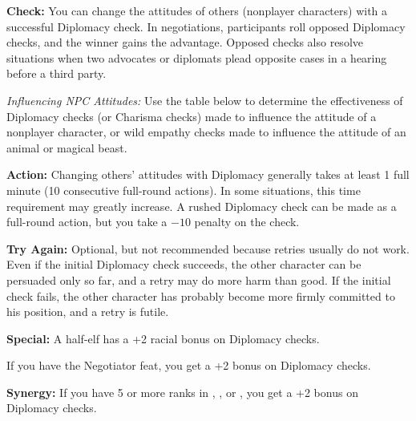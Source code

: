 \textbf{Check:} You can change the attitudes of others (nonplayer characters) with a successful Diplomacy check. In negotiations, participants roll opposed Diplomacy checks, and the winner gains the advantage. Opposed checks also resolve situations when two advocates or diplomats plead opposite cases in a hearing before a third party.

\textit{Influencing NPC Attitudes:} Use the table below to determine the effectiveness of Diplomacy checks (or Charisma checks) made to influence the attitude of a nonplayer character, or wild empathy checks made to influence the attitude of an animal or magical beast.



\textbf{Action:} Changing others' attitudes with Diplomacy generally takes at least 1 full minute (10 consecutive full-round actions). In some situations, this time requirement may greatly increase. A rushed Diplomacy check can be made as a full-round action, but you take a $-10$ penalty on the check.

\textbf{Try Again:} Optional, but not recommended because retries usually do not work. Even if the initial Diplomacy check succeeds, the other character can be persuaded only so far, and a retry may do more harm than good. If the initial check fails, the other character has probably become more firmly committed to his position, and a retry is futile.

\textbf{Special:} A half-elf has a +2 racial bonus on Diplomacy checks.

If you have the Negotiator feat, you get a +2 bonus on Diplomacy checks.

\textbf{Synergy:} If you have 5 or more ranks in , , or , you get a +2 bonus on Diplomacy checks.